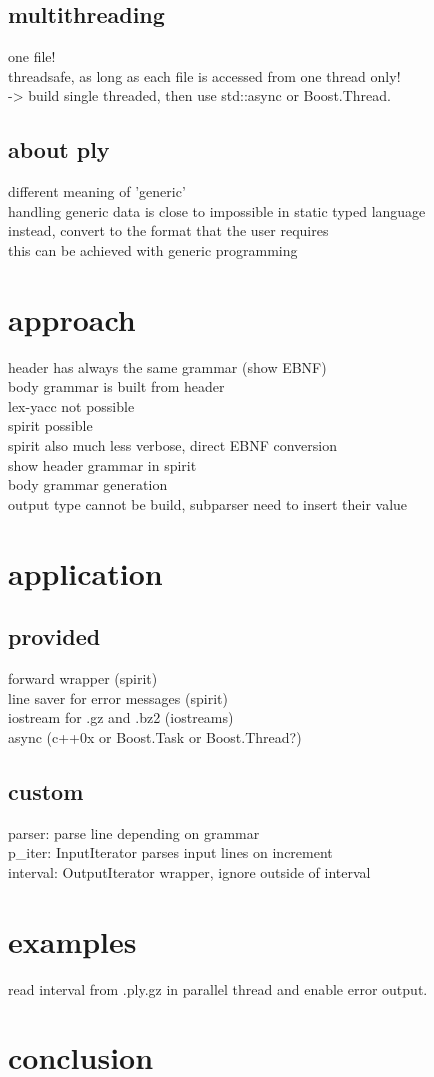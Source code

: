 \documentclass{article}
\begin{document}
\subsection{multithreading}
%
one file!\\
threadsafe, as long as each file is accessed from one thread only!\\
-> build single threaded, then use std::async or Boost.Thread.\\

\subsection{about ply}
different meaning of 'generic'\\
handling generic data is close to impossible in static typed language\\
instead, convert to the format that the user requires\\
this can be achieved with generic programming\\

\section{approach}
%
header has always the same grammar (show EBNF)\\
body grammar is built from header\\
lex-yacc not possible\\
spirit possible\\
spirit also much less verbose, direct EBNF conversion\\
show header grammar in spirit\\
body grammar generation\\
output type cannot be build, subparser need to insert their value\\

\section{application}
%
\subsection{provided}
forward wrapper (spirit)\\
line saver for error messages (spirit)\\
iostream for .gz and .bz2 (iostreams)\\
async (c++0x or Boost.Task or Boost.Thread?)\\

\subsection{custom}
parser: parse line depending on grammar\\
p\_iter: InputIterator parses input lines on increment\\
interval: OutputIterator wrapper, ignore outside of interval\\

\section{examples}
read interval from .ply.gz in parallel thread and enable error output.

\section{conclusion}
\end{document}
